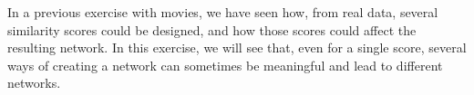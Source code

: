 \documentclass[addpoints]{exam}
\begin{document}
\begin{center}
\end{center}



\begin{tcolorbox}[colback=black!5!white,colframe=white!75!black]
In a previous exercise with movies, we have seen how, from real data, several similarity scores could be designed, and how those scores could affect the resulting network.
In this exercise, we will see that, even for a single score, several ways of creating a network can sometimes be meaningful and lead to different networks.
\end{tcolorbox}
\end{document}
